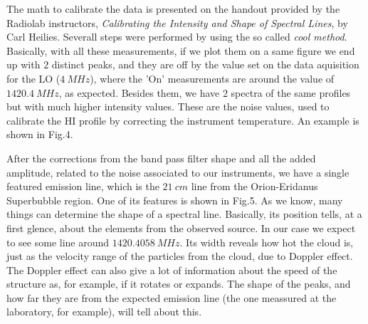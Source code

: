 \documentclass{article}
\begin{document}
The math to calibrate the data is presented on the handout provided by the Radiolab instructors,
\emph{Calibrating the Intensity and Shape of Spectral Lines}, by Carl Heilies.
Severall steps were performed by using the so called \emph{cool method}. Basically, with all these
measurements, if we plot them on a same figure
we end up with $2$ distinct peaks, and they are off by the value set on the data aquisition 
for the LO ($4 \ MHz$), where the 'On' measurements are around the value of $1420.4 \ MHz$, as expected.
Besides them, we have $2$ spectra of the same profiles but with much higher intensity values. These are 
the noise values, used to calibrate the HI profile by correcting the instrument temperature. An example is shown in Fig.4. 

After the  corrections from the band pass
filter shape and all the added amplitude, related to the noise associated to our instruments,
we have a single featured emission line, which is the $21 \ cm$ line from the Orion-Eridanus
Superbubble region. One of its features is shown in Fig.5. As we know, many things can 
determine the shape of a spectral line. Basically, its position tells, at a 
first glence, about the elements
from the observed source. In our case we expect to see some line around $1420.4058 \ MHz$.
Its width reveals how hot the cloud is, just as the velocity range of the particles
from the cloud, due to Doppler effect. The Doppler effect can also 
give a lot of information  about the speed of the structure as, for example, if it 
rotates or expands. The shape of 
the peaks, and how far they are from the expected emission line (the one meassured at the
laboratory, for example), will tell about this.
\end{document}
